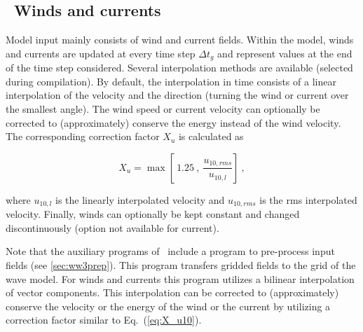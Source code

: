 \vssub
\subsection{~Winds and currents} \label{sub:num_w_c}
\vssub

\noindent
Model input mainly consists of wind and current fields. Within the model,
winds and currents are updated at every time step $\Delta t_g$ and represent
values at the end of the time step considered. Several interpolation methods
are available (selected during compilation). By default, the interpolation in
time consists of a linear interpolation of the velocity and the direction
(turning the wind or current over the smallest angle). The wind speed or
current velocity can optionally be corrected to (approximately) conserve the
energy instead of the wind velocity. The corresponding correction factor $X_u$
is calculated as


\begin{equation}
X_u = \max \left [ \: 1.25 \: , \: \frac{u_{10,rms}}{u_{10,l}}
\right ] \: , \label{eq:X_u10} \end{equation}

\noindent
where $u_{10,l}$ is the linearly interpolated velocity and $u_{10,rms}$ is the
rms interpolated velocity. Finally, winds can optionally be kept constant and
changed discontinuously (option not available for current).

Note that the auxiliary programs of \ws\ include a program to pre-process
input fields (see \para\ref{sec:ww3prep}). This program transfers gridded
fields to the grid of the wave model. For winds and currents this program
utilizes a bilinear interpolation of vector components. This interpolation can
be corrected to (approximately) conserve the velocity or the energy of the
wind or the current by utilizing a correction factor similar to
Eq.~(\ref{eq:X_u10}).
